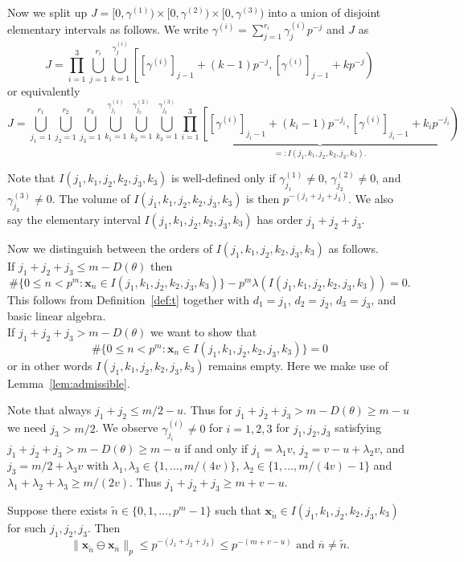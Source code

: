 \documentclass{article}
\newcommand{\bsx}{\boldsymbol{x}}%
\renewcommand{\(}{\left (}
\renewcommand{\)}{\right )}
\theoremstyle{definition}
\numberwithin{equation}{section}
\begin{document}
Now we split up $J=[0,\gamma^{(1)})\times [0,\gamma^{(2)})\times [0,\gamma^{(3)})$ into a union of disjoint elementary intervals as follows. We write $\gamma^{(i)}= \sum_{j=1}^{r_i}\gamma_j^{(i)}p^{-j}$ and $J$ as 
$$J=\prod_{i=1}^3 \bigcup_{j=1}^{r_i}\bigcup_{k=1}^{\gamma_j^{(i)}}\left[\left.[\gamma^{(i)}]_{j-1}+(k-1)p^{-j},[\gamma^{(i)}]_{j-1}+kp^{-j}\right)\right.$$
or equivalently
$$J=\bigcup_{j_1=1}^{r_1}\bigcup_{j_2=1}^{r_2}\bigcup_{j_3=1}^{r_3}\bigcup_{k_1=1}^{\gamma_{j_1}^{(1)}}\bigcup_{k_2=1}^{\gamma_{j_2}^{(2)}}\bigcup_{k_3=1}^{\gamma_{j_3}^{(3)}}\underbrace{\prod_{i=1}^3\left[\left.[\gamma^{(i)}]_{j_i-1}+(k_i-1)p^{-j_i},[\gamma^{(i)}]_{j_i-1}+k_ip^{-j_i}\right)\right.}_{=:I(j_1,k_1,j_2,k_2,j_3,k_3).}$$

Note that $I(j_1,k_1,j_2,k_2,j_3,k_3)$ is well-defined only if $\gamma_{j_1}^{(1)}\neq 0$, $\gamma_{j_2}^{(2)}\neq 0$, and $\gamma_{j_3}^{(3)}\neq 0$. The volume of $I(j_1,k_1,j_2,k_2,j_3,k_3)$ is then $p^{-(j_1+j_2+j_3)}$. We also say the elementary interval $I(j_1,k_1,j_2,k_2,j_3,k_3)$ has order $j_1+j_2+j_3$. 

Now we distinguish between the orders of $I(j_1,k_1,j_2,k_2,j_3,k_3)$ as follows. \\

If $j_1+j_2+j_3 \leq m-D(\theta)$ then $$\#\{0\leq n<p^m:\bsx_n\in I(j_1,k_1,j_2,k_2,j_3,k_3)\}-p^m\lambda (I(j_1,k_1,j_2,k_2,j_3,k_3))=0.$$
This follows from Definition~\ref{def:t} together with $d_1=j_1$, $d_2=j_2$, $d_3=j_3$, and basic linear algebra. \\%

If $j_1+j_2+j_3 > m-D(\theta)$ we want to show that $$\#\{0\leq n<p^m:\bsx_n\in I(j_1,k_1,j_2,k_2,j_3,k_3)\}=0$$ or in other words $I(j_1,k_1,j_2,k_2,j_3,k_3)$ remains empty. Here we make use of Lemma~\ref{lem:admissible}. 

Note that always $j_1+j_2\leq m/2-u$. Thus for $j_1+j_2+j_3 > m-D(\theta)\geq m-u$ we need $j_3>m/2$. We observe $\gamma_{j_i}^{(i)}\neq 0$ for $i=1,2,3$ for $j_1,j_2,j_3$ satisfying $j_1+j_2+j_3 > m-D(\theta)\geq m-u$ if and only if 
$j_1=\lambda_1 v$, $j_2=v-u+\lambda_2 v$, and $j_3=m/2 +\lambda_3 v$ with $\lambda_1,\lambda_3\in\{1,\ldots,m/(4v)\}$, $\lambda_2\in \{1,\ldots,m/(4v)-1\}$ and $\lambda_1+\lambda_2+\lambda_3\geq m/(2v)$. Thus $j_1+j_2+j_3 \geq m+v-u$. 

Suppose there exists $\tilde{n}\in\{0,1,\ldots,p^m-1\}$ such that $\bsx_{\tilde{n}}\in I(j_1,k_1,j_2,k_2,j_3,k_3)$ for such $j_1,j_2,j_3$. Then 
$$\|\bsx_{\tilde{n}}\ominus \bsx_{\overline{n}}\|_p\leq p^{-(j_1+j_2+j_3)}\leq p^{-(m+v-u)}\mbox{ and }\overline{n}\neq \tilde{n}.$$
\end{document}
